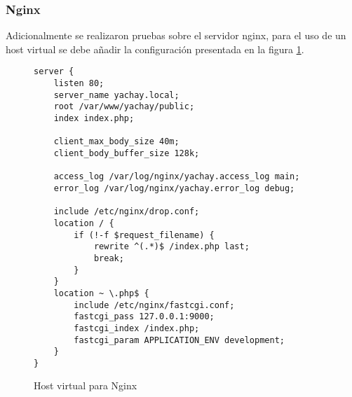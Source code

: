 \subsubsection{Nginx}
Adicionalmente se realizaron pruebas sobre el servidor nginx, para el uso de un
host virtual se debe añadir la configuración presentada en la figura
\ref{config_nginx}.

\begin{figure}
\begin{verbatim}
server {
    listen 80;
    server_name yachay.local;
    root /var/www/yachay/public;
    index index.php;

    client_max_body_size 40m;
    client_body_buffer_size 128k;

    access_log /var/log/nginx/yachay.access_log main;
    error_log /var/log/nginx/yachay.error_log debug;

    include /etc/nginx/drop.conf;
    location / {
        if (!-f $request_filename) {
            rewrite ^(.*)$ /index.php last;
            break;
        }
    }
    location ~ \.php$ {
        include /etc/nginx/fastcgi.conf;
        fastcgi_pass 127.0.0.1:9000;
        fastcgi_index /index.php;
        fastcgi_param APPLICATION_ENV development;
    }
}
\end{verbatim}
\caption{Host virtual para Nginx}
\label{config_nginx}
\end{figure}

